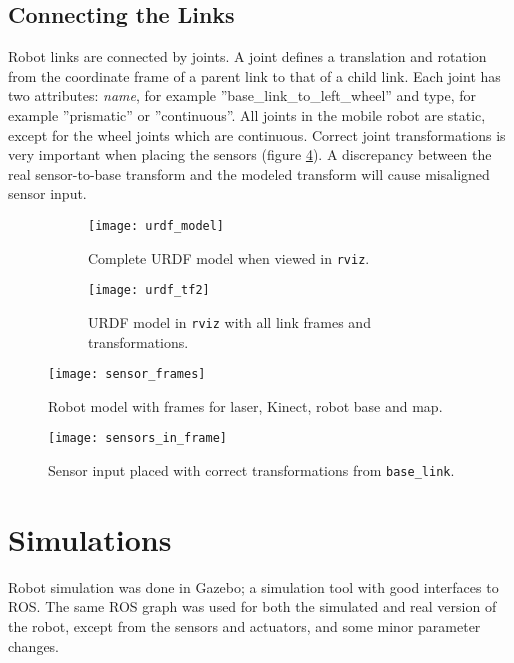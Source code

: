 \subsection{Connecting the Links}

Robot links are connected by joints. A joint defines a translation and rotation from the coordinate frame of a parent link to that of a child link. Each joint has two attributes: \textit{name}, for example ''base\_link\_to\_left\_wheel'' and type, for example ''prismatic'' or ''continuous''. All joints in the mobile robot are static, except for the wheel joints which are continuous. Correct joint transformations is very important when placing the sensors (figure \ref{fig:sensor_frames}). A discrepancy between the real sensor-to-base transform and the modeled transform will cause misaligned sensor input.

 \begin{figure}
 	\centering
 	\begin{subfigure}[b]{0.402\textwidth}
 		\texttt{[image: urdf\_model]}
 		\caption{Complete \ac{URDF} model when viewed in \texttt{rviz}.}
 		\label{fig:urdf_model}
 	\end{subfigure}
 	\begin{subfigure}[b]{0.51\textwidth}
 		
 		\texttt{[image: urdf\_tf2]}
 		\caption{\ac{URDF} model in \texttt{rviz} with all link frames and transformations.}
 		\label{fig:urdf_tf}
 	\end{subfigure}
 	\caption{}
 \end{figure}

\begin{figure}[h]
	\centering
	\texttt{[image: sensor\_frames]}
	\caption{Robot model with frames for laser, Kinect, robot base and map. }
	\label{fig:sensor_frames}
\end{figure}

\begin{figure}[h]
	\centering
	\texttt{[image: sensors\_in\_frame]}
	\caption{Sensor input placed with correct transformations from \texttt{base\_link}. }
	\label{fig:sensors_in_frame}
\end{figure}


\section{Simulations}

Robot simulation was done in Gazebo; a simulation tool with good interfaces to \ac{ROS}. The same \ac{ROS} graph was used for both the simulated and real version of the robot, except from the sensors and actuators, and some minor parameter changes. 


